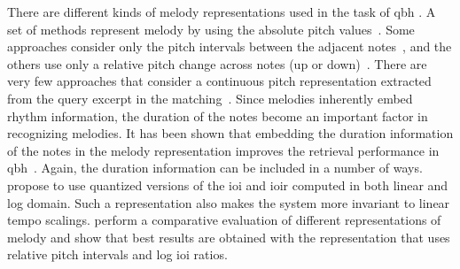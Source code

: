 There are different kinds of melody representations used in the task of \gls{qbh} . A set of methods represent melody by using the absolute pitch values~\citep{McNab1996,uitdenbogerd1998manipulation}. Some approaches consider only the pitch intervals between the adjacent notes~\citep{pauws2004cubyhum}, and the others use only a relative pitch change across notes (up or down)~\citep{ghias1995query}. There are very few approaches that consider a continuous pitch representation extracted from the query excerpt in the matching~\citep{mazzoni2001melody}. Since melodies inherently embed rhythm information, the duration of the notes become an important factor in recognizing melodies. It has been shown that embedding the duration information of the notes in the melody representation improves the retrieval performance in \gls{qbh}~\citep{pardo2002encoding}. Again, the duration information can be included in a number of ways. \cite{pardo2002encoding} propose to use quantized versions of the \gls{ioi} and \gls{ioir} computed in both linear and log domain. Such a representation also makes the system more invariant to linear tempo scalings. \cite{dannenberg2007comparative} perform a comparative evaluation of different representations of melody and show that best results are obtained with the representation that uses relative pitch intervals and log \gls{ioi} ratios. 

